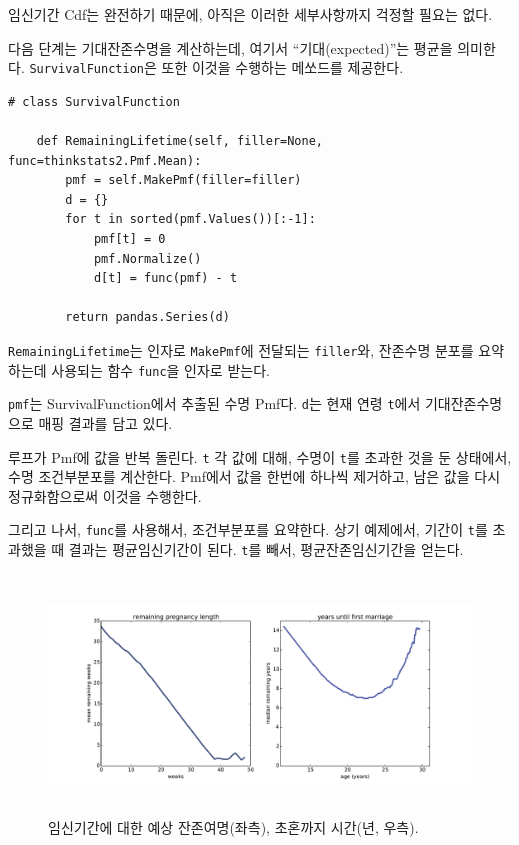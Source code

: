 임신기간 Cdf는 완전하기 때문에, 아직은 이러한 세부사항까지 걱정할 필요는 없다.

다음 단계는 기대잔존수명을 계산하는데, 여기서 ``기대(expected)''는 평균을 의미한다.
{\tt SurvivalFunction}은 또한 이것을 수행하는 메쏘드를 제공한다.

\begin{verbatim}
# class SurvivalFunction

    def RemainingLifetime(self, filler=None, func=thinkstats2.Pmf.Mean):
        pmf = self.MakePmf(filler=filler)
        d = {}
        for t in sorted(pmf.Values())[:-1]:
            pmf[t] = 0
            pmf.Normalize()
            d[t] = func(pmf) - t

        return pandas.Series(d)
\end{verbatim}

{\tt RemainingLifetime}는 인자로 {\tt MakePmf}에 전달되는 {\tt filler}와, 
잔존수명 분포를 요약하는데 사용되는 함수 {\tt func}을 인자로 받는다.

{\tt pmf}는 SurvivalFunction에서 추출된 수명 Pmf다.
{\tt d}는  현재 연령 {\tt t}에서 기대잔존수명으로 매핑 결과를 담고 있다.

루프가 Pmf에 값을 반복 돌린다. {\tt t} 각 값에 대해, 수명이 {\tt t}를 초과한 것을 둔 상태에서, 수명 조건부분포를 계산한다.
Pmf에서 값을 한번에 하나씩 제거하고, 남은 값을 다시 정규화함으로써 이것을 수행한다.

그리고 나서, {\tt func}를 사용해서, 조건부분포를 요약한다.
상기 예제에서, 기간이 {\tt t}를 초과했을 때 결과는 평균임신기간이 된다.
{\tt t}를 빼서, 평균잔존임신기간을 얻는다.

\begin{figure}
\centerline{\includegraphics[height=2.5in]{figs/survival6.pdf}}
\caption{임신기간에 대한 예상 잔존여명(좌측), 초혼까지 시간(년, 우측).}
\label{survival6}
\end{figure}

